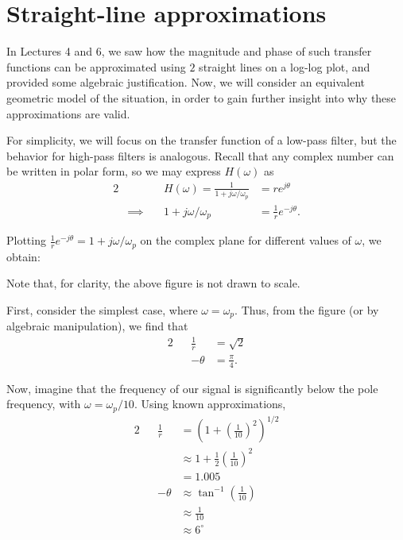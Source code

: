 \documentclass[letterpaper]{article}
\theoremstyle{remark}
\newcommand{\eqn}[1]{\begin{alignat*}{2}#1\end{alignat*}}
\newcommand*{\thus}{&\implies\quad&}
\begin{document}
\section{Straight-line approximations}
In Lectures 4 and 6, we saw how the magnitude and phase of such transfer functions can be approximated using $2$ straight lines on a log-log plot, and provided some algebraic justification. Now, we will consider an equivalent geometric model of the situation, in order to gain further insight into why these approximations are valid.

For simplicity, we will focus on the transfer function of a low-pass filter, but the behavior for high-pass filters is analogous. Recall that any complex number can be written in polar form, so we may express $H(\omega)$ as
\eqn{
    && H(\omega) = \frac{1}{1 + j\omega / \omega_p} &= re^{j\theta} \\
    \thus 1 + j\omega / \omega_p &= \frac{1}{r} e^{-j\theta}.
}

Plotting $\frac{1}{r} e^{-j\theta} = 1 + j\omega / \omega_p$ on the complex plane for different values of $\omega$, we obtain:
\begin{center}
\end{center}
Note that, for clarity, the above figure is not drawn to scale.

First, consider the simplest case, where $\omega = \omega_p$. Thus, from the figure (or by algebraic manipulation), we find that
\eqn{
    && \frac{1}{r} &= \sqrt{2} \\
    && -\theta &= \frac{\pi}{4}.
}

Now, imagine that the frequency of our signal is significantly below the pole frequency, with $\omega = \omega_p / 10$. Using known approximations,
\eqn{
    && \frac{1}{r} &= \left(1 + \left(\frac{1}{10}\right)^2\right)^{1/2} \\
    &&&\approx 1 + \frac{1}{2} \left(\frac{1}{10} \right)^2 \\
    &&&= 1.005 \\
    && -\theta &\approx \tan^{-1}\left(\frac{1}{10}\right) \\
    &&&\approx \frac{1}{10} \\
    &&&\approx 6^{\circ}
}
\end{document}
